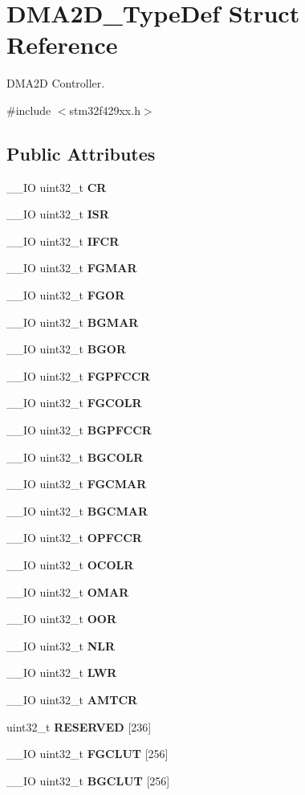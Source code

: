 \section{D\+M\+A2\+D\+\_\+\+Type\+Def Struct Reference}
\label{structDMA2D__TypeDef}


D\+M\+A2D Controller.  




{\ttfamily \#include $<$stm32f429xx.\+h$>$}

\subsection*{Public Attributes}
\begin{DoxyCompactItemize}
\item 
\+\_\+\+\_\+\+IO uint32\+\_\+t \textbf{ CR}
\item 
\+\_\+\+\_\+\+IO uint32\+\_\+t \textbf{ I\+SR}
\item 
\+\_\+\+\_\+\+IO uint32\+\_\+t \textbf{ I\+F\+CR}
\item 
\+\_\+\+\_\+\+IO uint32\+\_\+t \textbf{ F\+G\+M\+AR}
\item 
\+\_\+\+\_\+\+IO uint32\+\_\+t \textbf{ F\+G\+OR}
\item 
\+\_\+\+\_\+\+IO uint32\+\_\+t \textbf{ B\+G\+M\+AR}
\item 
\+\_\+\+\_\+\+IO uint32\+\_\+t \textbf{ B\+G\+OR}
\item 
\+\_\+\+\_\+\+IO uint32\+\_\+t \textbf{ F\+G\+P\+F\+C\+CR}
\item 
\+\_\+\+\_\+\+IO uint32\+\_\+t \textbf{ F\+G\+C\+O\+LR}
\item 
\+\_\+\+\_\+\+IO uint32\+\_\+t \textbf{ B\+G\+P\+F\+C\+CR}
\item 
\+\_\+\+\_\+\+IO uint32\+\_\+t \textbf{ B\+G\+C\+O\+LR}
\item 
\+\_\+\+\_\+\+IO uint32\+\_\+t \textbf{ F\+G\+C\+M\+AR}
\item 
\+\_\+\+\_\+\+IO uint32\+\_\+t \textbf{ B\+G\+C\+M\+AR}
\item 
\+\_\+\+\_\+\+IO uint32\+\_\+t \textbf{ O\+P\+F\+C\+CR}
\item 
\+\_\+\+\_\+\+IO uint32\+\_\+t \textbf{ O\+C\+O\+LR}
\item 
\+\_\+\+\_\+\+IO uint32\+\_\+t \textbf{ O\+M\+AR}
\item 
\+\_\+\+\_\+\+IO uint32\+\_\+t \textbf{ O\+OR}
\item 
\+\_\+\+\_\+\+IO uint32\+\_\+t \textbf{ N\+LR}
\item 
\+\_\+\+\_\+\+IO uint32\+\_\+t \textbf{ L\+WR}
\item 
\+\_\+\+\_\+\+IO uint32\+\_\+t \textbf{ A\+M\+T\+CR}
\item 
uint32\+\_\+t \textbf{ R\+E\+S\+E\+R\+V\+ED} [236]
\item 
\+\_\+\+\_\+\+IO uint32\+\_\+t \textbf{ F\+G\+C\+L\+UT} [256]
\item 
\+\_\+\+\_\+\+IO uint32\+\_\+t \textbf{ B\+G\+C\+L\+UT} [256]
\end{DoxyCompactItemize}


